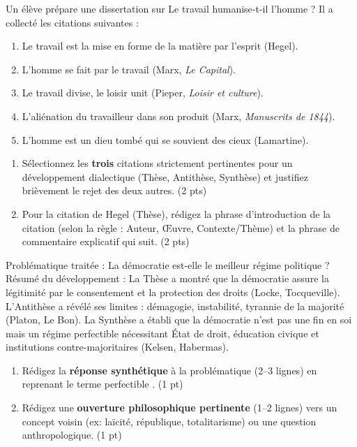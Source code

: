 \documentclass[11pt]{article}
\begin{document}
\begin{exercice}
Un élève prépare une dissertation sur \og Le travail humanise-t-il l'homme ? \fg{} Il a collecté les citations suivantes :
\begin{enumerate}
    \item \og Le travail est la mise en forme de la matière par l'esprit \fg{} (Hegel).
    \item \og L'homme se fait par le travail \fg{} (Marx, \textit{Le Capital}).
    \item \og Le travail divise, le loisir unit \fg{} (Pieper, \textit{Loisir et culture}).
    \item \og L'aliénation du travailleur dans son produit \fg{} (Marx, \textit{Manuscrits de 1844}).
    \item \og L'homme est un dieu tombé qui se souvient des cieux \fg{} (Lamartine).
\end{enumerate}
\begin{enumerate}
    \item Sélectionnez les \textbf{trois} citations strictement pertinentes pour un développement dialectique (Thèse, Antithèse, Synthèse) et justifiez brièvement le rejet des deux autres. (2 pts)
    \item Pour la citation de Hegel (Thèse), rédigez la phrase d'introduction de la citation (selon la règle : Auteur, Œuvre, Contexte/Thème) et la phrase de commentaire explicatif qui suit. (2 pts)
\end{enumerate}
\end{exercice}

\begin{exercice}
Problématique traitée : \og La démocratie est-elle le meilleur régime politique ? \fg{}
Résumé du développement : La Thèse a montré que la démocratie assure la légitimité par le consentement et la protection des droits (Locke, Tocqueville). L'Antithèse a révélé ses limites : démagogie, instabilité, tyrannie de la majorité (Platon, Le Bon). La Synthèse a établi que la démocratie n'est pas une fin en soi mais un régime \og perfectible \fg{} nécessitant État de droit, éducation civique et institutions contre-majoritaires (Kelsen, Habermas).
\begin{enumerate}
    \item Rédigez la \textbf{réponse synthétique} à la problématique (2--3 lignes) en reprenant le terme \og perfectible \fg{}. (1 pt)
    \item Rédigez une \textbf{ouverture philosophique pertinente} (1--2 lignes) vers un concept voisin (ex: laïcité, république, totalitarisme) ou une question anthropologique. (1 pt)
\end{enumerate}
\end{exercice}
\end{document}
